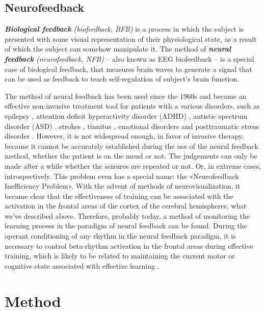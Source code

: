 \documentclass[14pt,a4paper]{scrartcl}
\begin{document}
\subsection{Neurofeedback}
\label{sec:Hypothesis:Neurofeedback}

\textit{\textbf{Biological feedback} (biofeedback, BFB)} is a process in which the subject is presented with some visual representation of their physiological state, as a result of which the subject can somehow manipulate it. The method of \textit{\textbf{neural feedback} (neurofeedback, NFB)} – also known as EEG biofeedback – is a special case of biological feedback, that measures brain waves to generate a signal that can be used as feedback to teach self-regulation of subject's brain function. 

The method of neural feedback has been used since the 1960s and became an effective non-invasive treatment tool for patients with a various disorders, such as epilepsy \cite{Strehl2014,Kotchoubey2001}, attention deficit hyperactivity disorder (ADHD) \cite{Leins2007,Sonuga-Barke2013,Thompson2005}, autistic spectrum disorder (ASD) \cite{Kouijzer2009,Thompson2009}, strokes \cite{Rayegani2014}, tinnitus \cite{Hartmann2014}, emotional disorders \cite{Raymond2005} and posttraumatic stress disorder \cite{Othmer2009}. However, it is not widespread enough, in favor of invasive therapy, because it cannot be accurately established during the use of the neural feedback method, whether the patient is on the mend or not. The judgements can only be made after a while whether the seizures are repeated or not. Or, in extreme cases, introspectively. This problem even has a special name: the «Neurofeedback Inefficiency Problem». With the advent of methods of neurovisualization, it became clear that the effectiveness of training can be associated with the activation in the frontal areas of the cortex of the cerebral hemispheres, what we’ve described above. Therefore, probably today, a method of monitoring the learning process in the paradigm of neural feedback can be found. During the operant conditioning of any rhythm in the neural feedback paradigm, it is necessary to control beta-rhythm activation in the frontal areas during effective training, which is likely to be related to maintaining the current motor or cognitive state associated with effective learning \cite{Engel2010}. 

\newpage
\section{Method}
\label{sec:Method}  
\end{document}
